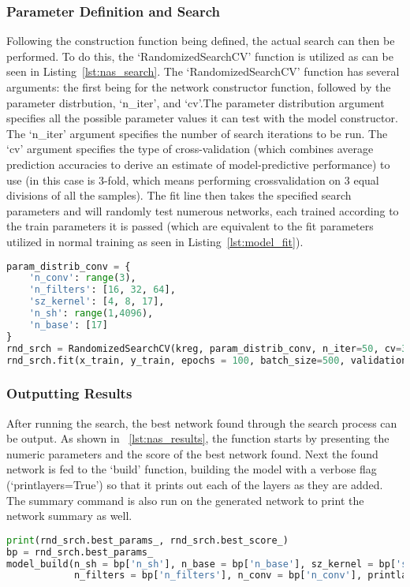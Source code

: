 \documentclass[12pt,letterpaper,oneside,reqno]{book}
\theoremstyle{plain}
\theoremstyle{definition}
\theoremstyle{plain}
\theoremstyle{remark}
\theoremstyle{plain}
\theoremstyle{definition}
\theoremstyle{plain}
\begin{document}
\subsubsection{Parameter Definition and Search}
Following the construction function being defined, the actual search can then be performed. To do this, the `RandomizedSearchCV' function is utilized as can be seen in Listing~\ref{lst:nas_search}. The `RandomizedSearchCV' function has several arguments:  the first being for the network constructor function, followed by the parameter distrbution, `n\_iter', and `cv'.The parameter distribution argument specifies all the possible parameter values it can test with the model constructor. The `n\_iter' argument specifies the number of search iterations to be run. The `cv' argument specifies the type of cross-validation (which combines average prediction accuracies to derive an estimate of model-predictive performance) to use (in this case is 3-fold, which means performing crossvalidation on 3 equal divisions of all the samples). The fit line then takes the specified search parameters and will randomly test numerous networks, each trained according to the train parameters it is passed (which are equivalent to the fit parameters utilized in normal training as seen in Listing~\ref{lst:model_fit}).
\begin{lstlisting}[language=Python, caption={Code for Performing Search (NAS)}, label=lst:nas_search, frame=single]
param_distrib_conv = {
    'n_conv': range(3),
    'n_filters': [16, 32, 64],
    'sz_kernel': [4, 8, 17],
    'n_sh': range(1,4096),
    'n_base': [17]
}
rnd_srch = RandomizedSearchCV(kreg, param_distrib_conv, n_iter=50, cv=3)
rnd_srch.fit(x_train, y_train, epochs = 100, batch_size=500, validation_data = (x_val, y_val), callbacks = [tf.keras.callbacks.EarlyStopping(patience = 4)])
\end{lstlisting}
\subsubsection{Outputting Results}
After running the search, the best network found through the search process can be output. As shown in ~\ref{lst:nas_results}, the function starts by presenting the numeric parameters and the score of the best network found. Next the found network is fed to the `build' function, building the model with a verbose flag (`printlayers=True') so that it prints out each of the layers as they are added. The summary command is also run on the generated network to print the network summary as well. %
\begin{lstlisting}[language=Python, caption={Code for Outputting NAS Search Results}, label=lst:nas_results, frame=single]
print(rnd_srch.best_params_, rnd_srch.best_score_)
bp = rnd_srch.best_params_
model_build(n_sh = bp['n_sh'], n_base = bp['n_base'], sz_kernel = bp['sz_kernel'],
            n_filters = bp['n_filters'], n_conv = bp['n_conv'], printlayers = True).summary()
\end{lstlisting}
\end{document}
